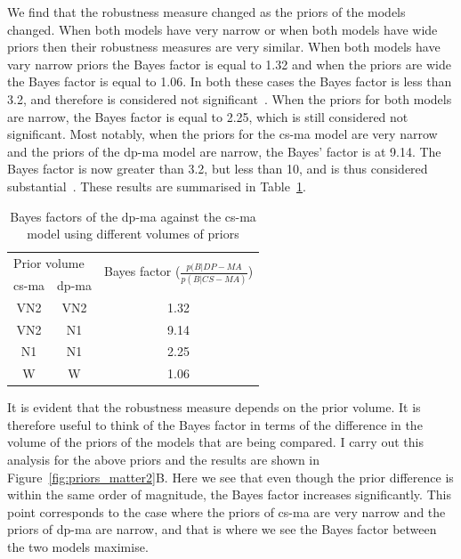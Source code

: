 We find that the robustness measure changed as the priors of the models changed. When both models have very narrow or when both models have wide priors then their robustness measures are very similar. When both models have vary narrow priors the Bayes factor is equal to 1.32 and when the priors are wide the Bayes factor is equal to 1.06. In both these cases the Bayes factor is less than 3.2, and therefore is considered not significant~\autocite{Kass:1995vb}. When the priors for both models are narrow, the Bayes factor is equal to 2.25, which is still considered not significant. Most notably, when the priors for the \acrshort{cs-ma} model are very narrow and the priors of the \acrshort{dp-ma} model are narrow, the Bayes' factor is at 9.14. The Bayes factor is now greater than 3.2, but less than 10, and is thus considered substantial~\autocite{Kass:1995vb}.  These results are summarised in Table~\ref{tab:bayes_vols}.

\begin{table}[tb]
\centering
\caption{Bayes factors of the \acrshort{dp-ma} against the \acrshort{cs-ma}  model using different volumes of priors}
\label{tab:bayes_vols}
\begin{tabular}{@{}ccc@{}}
\toprule
\multicolumn{2}{l}{Prior volume} & \multirow{2}{4cm}{Bayes factor  ($\frac{p(B|DP-MA}{p(B|CS-MA)}$)  } \\ \cmidrule(r){1-2}
\acrshort{cs-ma}  & \acrshort{dp-ma} &  \\ \midrule
VN2 & VN2 & 1.32 \\
VN2 & N1 & 9.14 \\
N1 & N1 & 2.25 \\
W & W & 1.06 \\ \bottomrule
\end{tabular}
\end{table}

It is evident that the robustness measure depends on the prior volume. It is therefore useful to think of the Bayes factor in terms of the difference in the volume of the priors of the models that are being compared. I carry out this analysis for the above priors and the results are shown in Figure~\ref{fig:priors_matter2}B. Here we see that even though the prior difference is within the same order of magnitude, the Bayes factor increases significantly. This point corresponds to the case where the priors of \acrshort{cs-ma} are very narrow and the priors of \acrshort{dp-ma} are narrow, and that is where we see the Bayes factor between the two models maximise. %

